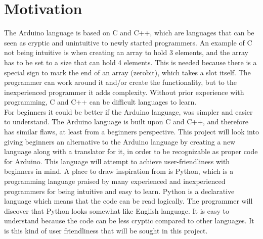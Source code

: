 \section{Motivation}\label{introduction:motivation}
The Arduino language is based on C and C++, which are languages that can be seen as cryptic and unintuitive to newly started programmers. An example of C not being intuitive is when creating an array to hold 3 elements, and the array has to be set to a size that can hold 4 elements. This is needed because there is a special sign to mark the end of an array (zerobit), which takes a slot itself. The programmer can work around it and/or create the functionality, but to the inexperienced programmer it adds complexity. 
Without prior experience with programming, C and C++ can be difficult languages to learn. \\

For beginners it could be better if the Arduino language, was simpler and easier to understand. The Arduino language is built upon C and C++, and therefore has similar flaws, at least from a beginners perspective. This project will look into giving beginners an alternative to the Arduino language by creating a new language along with a translator for it, in order to be recognizable as proper code for Arduino. This language will attempt to achieve user-friendliness with beginners in mind. A place to draw inspiration from is Python, which is a programming language praised by many experienced and inexperienced programmers for being intuitive and easy to learn. \cite{python:about} Python is a declarative language which means that the code can be read logically. The programmer will discover that Python looks somewhat like English language. It is easy to understand because the code can be less cryptic compared to other languages. It is this kind of user friendliness that will be sought in this project.